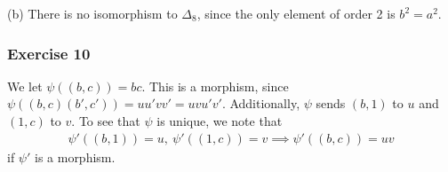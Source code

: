 (b) There is no isomorphism to $\Delta_8$, since the only element of order 2 is $b^2 = a^2$.

\subsubsection{Exercise 10}
We let $\psi((b, c)) = bc$. This is a morphism, since $\psi((b, c)(b', c')) = uu'vv' = uvu'v'$. Additionally,
$\psi$ sends $(b, 1)$ to $u$ and $(1, c)$ to $v$. To see that $\psi$ is unique, we note that
\begin{align*}
        \psi'((b, 1)) = u, \: \psi'((1, c)) = v \implies \psi'((b, c)) = uv
\end{align*}
if $\psi'$ is a morphism. 
